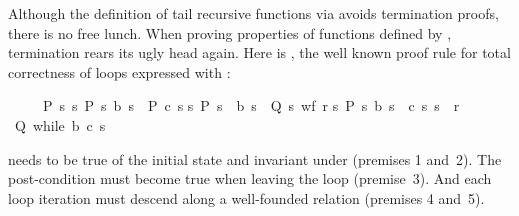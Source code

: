 \begin{isabellebody}
\begin{isamarkuptext}
Although the definition of tail recursive functions via  avoids
termination proofs, there is no free lunch. When proving properties of
functions defined by , termination rears its ugly head
again. Here is , the well known proof rule for total
correctness of loops expressed with :
\begin{isabelle}%
\ \ \ \ \ {\isasymlbrakk}P\ s{\isacharsemicolon}\ {\isasymAnd}s{\isachardot}\ {\isasymlbrakk}P\ s{\isacharsemicolon}\ b\ s{\isasymrbrakk}\ {\isasymLongrightarrow}\ P\ {\isacharparenleft}c\ s{\isacharparenright}{\isacharsemicolon}\isanewline
\isaindent{\ \ \ \ \ \ \ \ }{\isasymAnd}s{\isachardot}\ {\isasymlbrakk}P\ s{\isacharsemicolon}\ {\isasymnot}\ b\ s{\isasymrbrakk}\ {\isasymLongrightarrow}\ Q\ s{\isacharsemicolon}\ wf\ r{\isacharsemicolon}\isanewline
\isaindent{\ \ \ \ \ \ \ \ }{\isasymAnd}s{\isachardot}\ {\isasymlbrakk}P\ s{\isacharsemicolon}\ b\ s{\isasymrbrakk}\ {\isasymLongrightarrow}\ {\isacharparenleft}c\ s{\isacharcomma}\ s{\isacharparenright}\ {\isasymin}\ r{\isasymrbrakk}\isanewline
\isaindent{\ \ \ \ \ }{\isasymLongrightarrow}\ Q\ {\isacharparenleft}while\ b\ c\ s{\isacharparenright}%
\end{isabelle}  needs to be true of
the initial state  and invariant under  (premises 1
and~2). The post-condition  must become true when leaving the loop
(premise~3). And each loop iteration must descend along a well-founded
relation  (premises 4 and~5).


\end{isamarkuptext}
\end{isabellebody}
